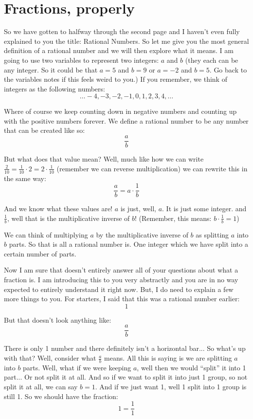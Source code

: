 \documentclass{article}
\begin{document}
\section*{Fractions, properly}

So we have gotten to halfway through the second page and I haven't even fully explained to you the title: Rational Numbers. 
So let me give you the most general definition of a rational number and we will then explore what it means. I am going to use two variables to represent two integers: $a$ and $b$ (they each can be any integer. So it could be that $a = 5$ and $b=9$ or $a=-2$ and $b=5$. Go back to the variables notes if this feels weird to you.)
If you remember, we think of integers as the following numbers: 
\[ \ldots -4, -3, -2, -1, 0, 1, 2, 3, 4, \ldots \]

Where of course we keep counting down in negative numbers and counting up with the positive numbers forever. We define a rational number to be any number that can be created like so: 
\[ \frac{a}{b} \]

But what does that value mean? Well, much like how we can write $\frac{2}{10} = \frac{1}{10} \cdot 2 = 2 \cdot \frac{1}{10}$ (remember we can reverse multiplication)
we can rewrite this in the same way: 
\[ \frac{a}{b} = a \cdot \frac{1}{b} \]

And we know what these values are! $a$ is just, well, $a$. It is just some integer. and $\frac{1}{b}$, well that is the multiplicative inverse of $b$! (Remember, this means: $b \cdot \frac{1}{b} = 1$)

We can think of multiplying $a$ by the multiplicative inverse of $b$ as splitting $a$ into $b$ parts. So that is all a rational number is. One integer which we have split into a certain number of parts. 

Now I am sure that doesn't entirely answer all of your questions about what a fraction is. I am introducing this to you very 
abstractly and you are in no way expected to entirely understand it right now. But, I do need to explain a few more things to you. For starters, I said that this was a rational number earlier: 
\[ 1 \]

But that doesn't look anything like: 
\[ \frac{a}{b} \]

There is only 1 number and there definitely isn't a horizontal bar... So what's up with that? Well, consider what $\frac{a}{b}$ means. All this is saying is we are splitting $a$ into $b$ parts. Well, what if we were keeping $a$, well then we would ``split'' it into 1 part... Or not split it at all. 
And so if we want to split it into just 1 group, so not split it at all, we can say $b=1$. And if we just want 1, well 1 split into 1 group is still 1. So we should have the fraction:
\[ 1 = \frac{1}{1} \]
\end{document}
